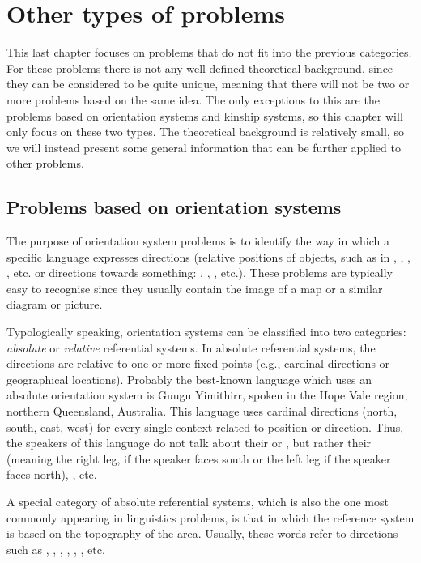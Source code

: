 \begin{refsection}
\hypertarget{others}{%
\chapter{Other types of problems}\label{chap-others}}

This last chapter focuses on problems that do not fit into the previous categories. For these problems there is not any well-defined theoretical background, since they can be considered to be quite unique, meaning that there will not be two or more problems based on the same idea. The only exceptions to this are the problems based on orientation systems and kinship systems, so this chapter will only focus on these two types. The theoretical background is relatively small, so we will instead present some general information that can be further applied to other problems.

\section{Problems based on orientation systems}

The purpose of orientation system problems is to identify the way in which a specific language expresses directions (relative positions of objects, such as in , , , , etc. or directions towards something: , , , etc.). These problems are typically easy to recognise since they usually contain the image of a map or a similar diagram or picture. 

Typologically speaking, orientation systems can be classified into two categories: \textit{absolute} or \textit{relative} referential systems. In absolute referential systems, the directions are relative to one or more fixed points (e.g., cardinal directions or geographical locations). Probably the best-known language which uses an absolute orientation system is Guugu Yimithirr, spoken in the Hope Vale region, northern Queensland, Australia. This language uses cardinal directions (north, south, east, west) for every single context related to position or direction. Thus, the speakers of this language do not talk about their  or , but rather their  (meaning the right leg, if the speaker faces south or the left leg if the speaker faces north), , etc.

A special category of absolute referential systems, which is also the one most commonly appearing in linguistics problems, is that in which the reference system is based on the topography of the area. Usually, these words refer to directions such as , , , , , , etc.


\end{refsection}
